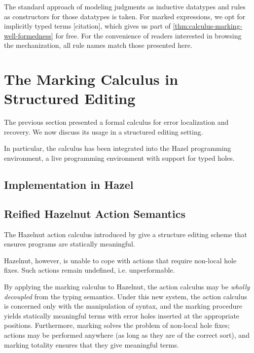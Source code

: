 The standard approach of modeling judgments as inductive datatypes and rules as constructors for
those datatypes is taken. For marked expressions, we opt for implicitly typed terms [citation],
which gives us part of \cref{thm:calculus-marking-well-formedness} for free. For the convenience of
readers interested in browsing the mechanization, all rule names match those presented here.

\section{The Marking Calculus in Structured Editing}
\label{sec:calculus-structured-editing}

The previous section presented a formal calculus for error localization and recovery. We now discuss
its usage in a structured editing setting. 

In particular, the calculus has been integrated into the Hazel programming environment, a live
programming environment with support for typed holes.

\subsection{Implementation in Hazel}
\label{sec:calculus-hazel}

\subsection{Reified Hazelnut Action Semantics}
\label{sec:calculus-hazelnut}

The Hazelnut action calculus introduced by \citet{HazelnutPOPL} give a structure editing scheme that
ensures programs are statically meaningful.

Hazelnut, however, is unable to cope with actions that require non-local hole fixes. %
Such actions remain undefined, i.e. unperformable.

By applying the marking calculus to Hazelnut, the action calculus may be \emph{wholly decoupled}
from the typing semantics. Under this new system, the action calculus is concerned only with the
manipulation of syntax, and the marking procedure yields statically meaningful terms with error
holes inserted at the appropriate positions. Furthermore, marking solves the problem of non-local
hole fixes; actions may be performed anywhere (as long as they are of the correct sort), and marking
totality ensures that they give meaningful terms.
